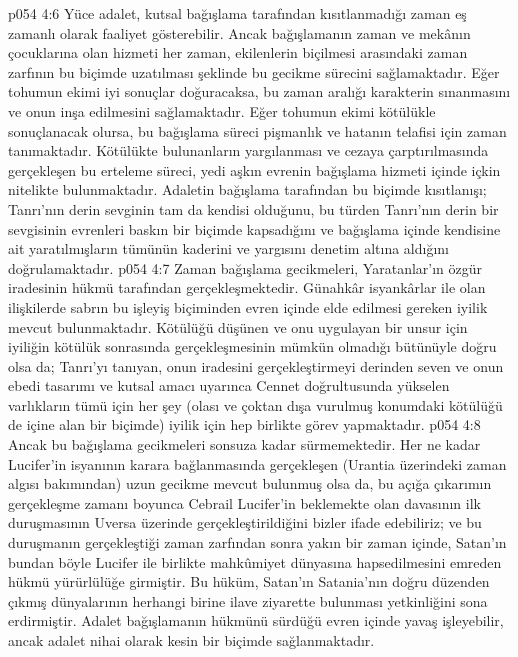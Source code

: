 \vs p054 4:6 Yüce adalet, kutsal bağışlama tarafından kısıtlanmadığı zaman eş zamanlı olarak faaliyet gösterebilir. Ancak bağışlamanın zaman ve mekânın çocuklarına olan hizmeti her zaman, ekilenlerin biçilmesi arasındaki zaman zarfının bu biçimde uzatılması şeklinde bu gecikme sürecini sağlamaktadır. Eğer tohumun ekimi iyi sonuçlar doğuracaksa, bu zaman aralığı karakterin sınanmasını ve onun inşa edilmesini sağlamaktadır. Eğer tohumun ekimi kötülükle sonuçlanacak olursa, bu bağışlama süreci pişmanlık ve hatanın telafisi için zaman tanımaktadır. Kötülükte bulunanların yargılanması ve cezaya çarptırılmasında gerçekleşen bu erteleme süreci, yedi aşkın evrenin bağışlama hizmeti içinde içkin nitelikte bulunmaktadır. Adaletin bağışlama tarafından bu biçimde kısıtlanışı; Tanrı’nın derin sevginin tam da kendisi olduğunu, bu türden Tanrı’nın derin bir sevgisinin evrenleri baskın bir biçimde kapsadığını ve bağışlama içinde kendisine ait yaratılmışların tümünün kaderini ve yargısını denetim altına aldığını doğrulamaktadır.
\vs p054 4:7 Zaman bağışlama gecikmeleri, Yaratanlar’ın özgür iradesinin hükmü tarafından gerçekleşmektedir. Günahkâr isyankârlar ile olan ilişkilerde sabrın bu işleyiş biçiminden evren içinde elde edilmesi gereken iyilik mevcut bulunmaktadır. Kötülüğü düşünen ve onu uygulayan bir unsur için iyiliğin kötülük sonrasında gerçekleşmesinin mümkün olmadığı bütünüyle doğru olsa da; Tanrı’yı tanıyan, onun iradesini gerçekleştirmeyi derinden seven ve onun ebedi tasarımı ve kutsal amacı uyarınca Cennet doğrultusunda yükselen varlıkların tümü için her şey (olası ve çoktan dışa vurulmuş konumdaki kötülüğü de içine alan bir biçimde) iyilik için hep birlikte görev yapmaktadır.
\vs p054 4:8 Ancak bu bağışlama gecikmeleri sonsuza kadar sürmemektedir. Her ne kadar Lucifer’in isyanının karara bağlanmasında gerçekleşen (Urantia üzerindeki zaman algısı bakımından) uzun gecikme mevcut bulunmuş olsa da, bu açığa çıkarımın gerçekleşme zamanı boyunca Cebrail  Lucifer’in beklemekte olan davasının ilk duruşmasının Uversa üzerinde gerçekleştirildiğini bizler ifade edebiliriz; ve bu duruşmanın gerçekleştiği zaman zarfından sonra yakın bir zaman içinde, Satan’ın bundan böyle Lucifer ile birlikte mahkûmiyet dünyasına hapsedilmesini emreden hükmü yürürlülüğe girmiştir. Bu hüküm, Satan’ın Satania’nın doğru düzenden çıkmış dünyalarının herhangi birine ilave ziyarette bulunması yetkinliğini sona erdirmiştir. Adalet bağışlamanın hükmünü sürdüğü evren içinde yavaş işleyebilir, ancak adalet nihai olarak kesin bir biçimde sağlanmaktadır.
